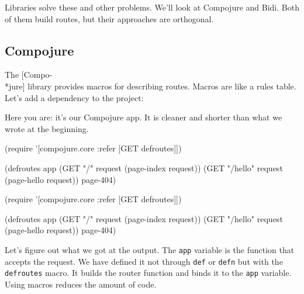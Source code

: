 Libraries solve these and other problems. We'll look at Compojure and Bidi. Both of them build routes, but their approaches are orthogonal.

\subsection{Compojure}

\label{compojure}


The [Compo-\\*jure] library provides macros for describing routes. Macros are like a rules table.
Let's add a dependency to the project:

\begin{english}
  \begin{clojure}
[compojure "1.6.1"]
  \end{clojure}
\end{english}

Here you are: it's our Compojure app. It is cleaner and shorter than what we wrote at the beginning.

\ifx\DEVICETYPE\MOBILE

\begin{english}
  \begin{clojure}
(require '[compojure.core
           :refer [GET defroutes]])

(defroutes app
  (GET "/" request
    (page-index request))
  (GET "/hello" request
    (page-hello request))
  page-404)
  \end{clojure}
\end{english}

\else

\begin{english}
  \begin{clojure}
(require '[compojure.core :refer [GET defroutes]])

(defroutes app
  (GET "/"      request (page-index request))
  (GET "/hello" request (page-hello request))
  page-404)
  \end{clojure}
\end{english}

\fi

Let's figure out what we got at the output. The \verb|app| variable is the function that accepts the request. We have defined it not through \verb|def| or \verb|defn| but with
the \verb|defroutes| macro. It builds the router function and binds it to the \verb|app| variable. Using macros reduces the amount of code.

